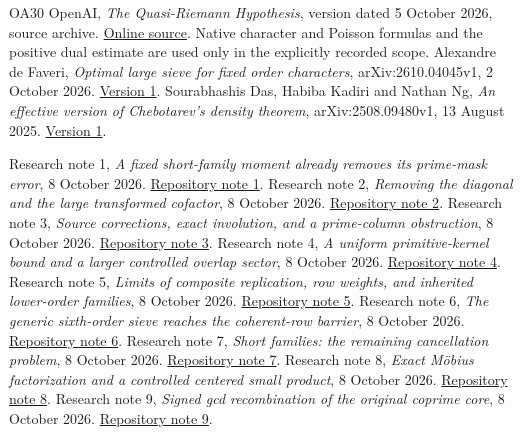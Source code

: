 \documentclass[11pt]{article}
\numberwithin{equation}{section}
\theoremstyle{definition}
\theoremstyle{remark}
\begin{document}
\begin{thebibliography}{OA30}
OpenAI, \emph{The Quasi-Riemann Hypothesis}, version dated
5 October 2026, source archive.
\href{https://github.com/openai/math/tree/main/preprints/The-Quasi-Riemann-Hypothesis-October-5-2026}{Online source}.
Native character and Poisson formulas and the positive dual estimate
are used only in the explicitly recorded scope.
Alexandre de Faveri, \emph{Optimal large sieve for fixed order characters},
arXiv:2610.04045v1, 2 October 2026.
\href{https://arxiv.org/html/2610.04045v1}{Version 1}.
Sourabhashis Das, Habiba Kadiri and Nathan Ng,
\emph{An effective version of Chebotarev's density theorem},
arXiv:2508.09480v1, 13 August 2025.
\href{https://arxiv.org/html/2508.09480v1}{Version 1}.

Research note 1, \emph{A fixed short-family moment already removes its prime-mask error}, 8 October 2026.
\href{notes/1_SHORT_FAMILY_DESCENT_REFINEMENT_20261008.md}{Repository note 1}.
Research note 2, \emph{Removing the diagonal and the large transformed cofactor}, 8 October 2026.
\href{notes/2_SHORT_FAMILY_SMALL_COFACTOR_20261008.md}{Repository note 2}.
Research note 3, \emph{Source corrections, exact involution, and a prime-column obstruction}, 8 October 2026.
\href{notes/3_SHORT_FAMILY_CORE_INVOLUTION_20261008.md}{Repository note 3}.
Research note 4, \emph{A uniform primitive-kernel bound and a larger controlled overlap sector}, 8 October 2026.
\href{notes/4_SHORT_FAMILY_HIGH_OVERLAP_20261008.md}{Repository note 4}.
Research note 5, \emph{Limits of composite replication, row weights, and inherited lower-order families}, 8 October 2026.
\href{notes/5_SHORT_FAMILY_REPLICATION_LIMITS_20261008.md}{Repository note 5}.
Research note 6, \emph{The generic sixth-order sieve reaches the coherent-row barrier}, 8 October 2026.
\href{notes/6_SHORT_FAMILY_SEXTIC_SIEVE_BARRIER_20261008.md}{Repository note 6}.
Research note 7, \emph{Short families: the remaining cancellation problem}, 8 October 2026.
\href{notes/7_SHORT_FAMILY_CONTINUATION_20261008.md}{Repository note 7}.
Research note 8, \emph{Exact M\"obius factorization and a controlled centered small product}, 8 October 2026.
\href{notes/8_SHORT_FAMILY_CENTERED_FACTORIZATION_20261008.md}{Repository note 8}.
Research note 9, \emph{Signed gcd recombination of the original coprime core}, 8 October 2026.
\href{notes/9_SHORT_FAMILY_SIGNED_GCD_RECOMBINATION_20261008.md}{Repository note 9}.

\end{thebibliography}
\end{document}
